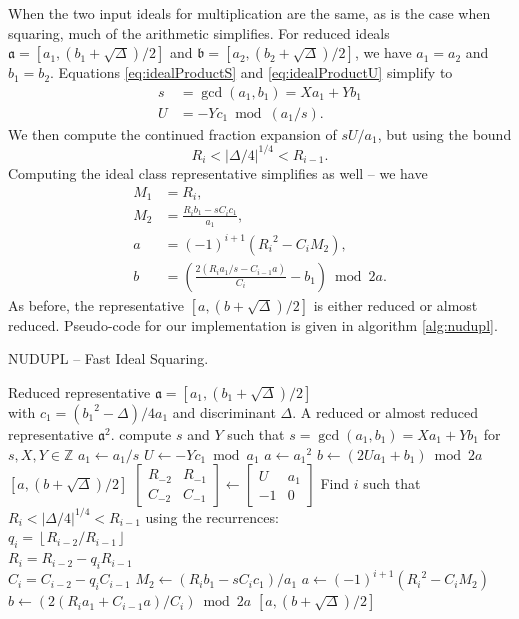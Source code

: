 \documentclass{ucalgthes1}
\theoremstyle{definition}
\newcommand{\ZZ}{\mathbb{Z}}
\newcommand{\matrixtt}[4]{\left[ \begin{array}{rr} #1 & #2 \\ #3 & #4 \end{array} \right]}
\newcommand{\floor}[1]{\left\lfloor #1 \right\rfloor}
\begin{document}
When the two input ideals for multiplication are the same, as is the case when squaring, much of the arithmetic simplifies.  For reduced ideals $\mathfrak a = [a_1, (b_1 + \sqrt\Delta)/2]$ and $\mathfrak b = [a_2, (b_2 + \sqrt\Delta)/2]$, we have $a_1=a_2$ and $b_1=b_2$.  Equations \ref{eq:idealProductS} and \ref{eq:idealProductU} simplify to
\begin{align*}
	s &= \gcd(a_1, b_1) = Xa_1 + Yb_1 \\
	U &= -Yc_1 \bmod (a_1/s).
\end{align*}
We then compute the continued fraction expansion of $sU/a_1$, but using the bound
\[
	R_i < |\Delta/4|^{1/4} < R_{i-1}.
\]
Computing the ideal class representative simplifies as well -- we have
\begin{align*}
	M_1 &= R_i, \\
	M_2 &= \frac{R_i b_1 - sC_i c_1}{a_1}, \\
	a &= (-1)^{i+1}({R_i}^2 - C_i M_2), \\
	b &= \left(\frac{2(R_i a_1/s  - C_{i-1} a)}{C_i} - b_1 \right) \bmod{2a}.
\end{align*}
As before, the representative $[a, (b+\sqrt\Delta)/2]$ is either reduced or almost reduced.  \break Pseudo-code for our implementation is given in algorithm \ref{alg:nudupl}.

\begin{algorithm}[h]
\caption{NUDUPL -- Fast Ideal Squaring.}
\label{alg:nudupl}
\begin{algorithmic}[1]
\REQUIRE Reduced representative $\mathfrak a = [a_1, (b_1+\sqrt\Delta)/2]$ \\
         with $c_1 = ({b_1}^2-\Delta)/4a_1$ and discriminant $\Delta$.
\ENSURE A reduced or almost reduced representative $\mathfrak a^2$.
\STATE compute $s$ and $Y$ such that $s = \gcd(a_1, b_1) = Xa_1 + Yb_1$ for $s,X,Y \in \ZZ$
\STATE $a_1 \gets a_1/s$
\STATE $U \gets -Yc_1 \bmod a_1$
	\STATE $a \gets {a_1}^2$
	\STATE $b \gets (2Ua_1 + b_1) \bmod 2a$
	\RETURN $[a, (b + \sqrt\Delta)/2]$
\ENDIF
\STATE $\matrixtt{R_{-2}}{R_{-1}}{C_{-2}}{C_{-1}} \gets \matrixtt{U}{a_1}{-1}{0}$
\STATE Find $i$ such that $R_i < |\Delta/4|^{1/4} < R_{i-1}$ using the recurrences: \\
       $q_i = \floor{R_{i-2}/R_{i-1}}$ \\
       $R_i = R_{i-2}-q_i R_{i-1}$ \\
       $C_i=C_{i-2}-q_i C_{i-1}$
\STATE $M_2 \gets (R_i b_1 -sC_i c_1)/a_1$
\STATE $a \gets (-1)^{i+1}({R_i}^2 - C_i M_2)$
\STATE $b \gets (2(R_i a_1 + C_{i-1} a)/C_i) \bmod{2a}$
\RETURN $[a, (b+\sqrt\Delta)/2]$
\end{algorithmic}
\end{algorithm}
\end{document}
